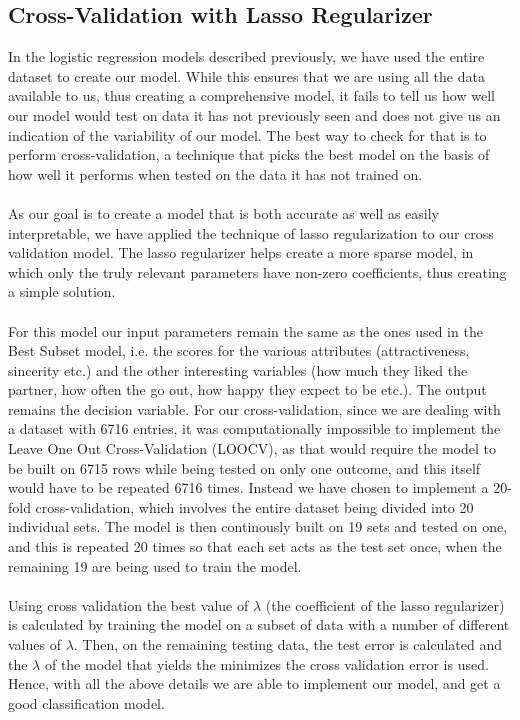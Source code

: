 \documentclass{article}
\begin{document}
\subsection{Cross-Validation with Lasso Regularizer}
In the logistic regression models described previously, we have used the entire dataset to create our model. While this ensures that we are using all the data available to us, thus creating a comprehensive model, it fails to tell us how well our model would test on data it has not previously seen and does not give us an indication of the variability of our model. The best way to check for that is to perform cross-validation, a technique that picks the best model on the basis of how well it performs when tested on the data it has not trained on. \\
\null\\
As our goal is to create a model that is both accurate as well as easily interpretable, we have applied the technique of lasso regularization to our cross validation model. The lasso regularizer helps create a more sparse model, in which only the truly relevant parameters have non-zero coefficients, thus creating a simple solution.\\
\null\\
For this model our input parameters remain the same as the ones used in the Best Subset model, i.e. the scores for the various attributes (attractiveness, sincerity etc.) and the other interesting variables (how much they liked the partner, how often the go out, how happy they expect to be etc.). The output remains the decision variable. For our cross-validation, since we are dealing with a dataset with 6716 entries, it was computationally impossible to implement the Leave One Out Cross-Validation (LOOCV), as that would require the model to be built on 6715 rows while being tested on only one outcome, and this itself would have to be repeated 6716 times. Instead we have chosen to implement a 20-fold cross-validation, which involves the entire dataset being divided into 20 individual sets. The model is then continously built on 19 sets and tested on one, and this is repeated 20 times so that each set acts as the test set once, when the remaining 19 are being used to train the model.\\
\null\\
Using cross validation the best value of $\lambda$ (the coefficient of the lasso regularizer) is calculated by training the model on a subset of data with a number of different values of $\lambda$.  Then, on the remaining testing data, the test error is calculated and the $\lambda$ of the model that yields the minimizes the cross validation error is used. Hence, with all the above details we are able to implement our model, and get a good classification model.
%
\end{document}
